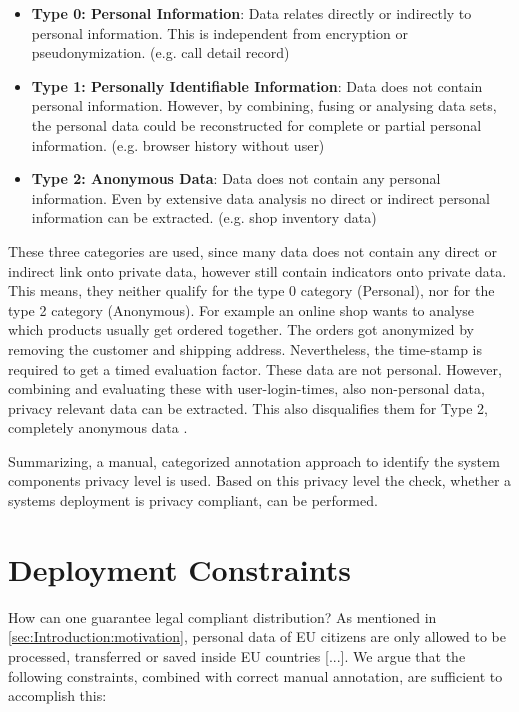 \begin{itemize}
	\item \textbf{Type 0: Personal Information}: Data relates directly or indirectly to personal information. This is independent from encryption or pseudonymization. (e.g. call detail record)
	
	\item \textbf{Type 1: Personally Identifiable Information}:  Data does not contain personal information. However, by combining, fusing or analysing data sets, the personal data could be reconstructed for complete or partial personal information. (e.g. browser history without user)
	
	\item \textbf{Type 2: Anonymous Data}: Data does not contain any personal information. Even by extensive data analysis no direct or indirect personal information can be extracted. (e.g. shop inventory data)
	
	\label{sec:PrivacyConcept:dataprivacylevel}
\end{itemize}

These three categories are used, since many data does not contain any direct or indirect link onto private data, however still contain indicators onto private data. This means, they neither qualify for the type 0 category (Personal), nor for the type 2 category (Anonymous). For example an online shop wants to analyse which products usually get ordered together. The orders got anonymized by removing the customer and shipping address. Nevertheless, the time-stamp is required to get a timed evaluation factor. These data are not personal. However, combining and evaluating these with user-login-times, also non-personal data, privacy relevant data can be extracted. This also disqualifies them for Type 2, completely anonymous data \cite{Schmieders.}\cite{Schmieders.2015}.

Summarizing, a manual, categorized annotation approach to identify the system components privacy level is used. Based on this privacy level the check, whether a systems deployment is privacy compliant, can be performed.


\section{Deployment Constraints}
\label{sec:PrivacyConcept:deploymentrules}

How can one guarantee legal compliant distribution? As mentioned in \autoref{sec:Introduction:motivation}, personal data of EU citizens are only allowed to be processed, transferred or saved inside EU countries [...]. We argue that the following constraints, combined with correct manual annotation, are sufficient to accomplish this:

